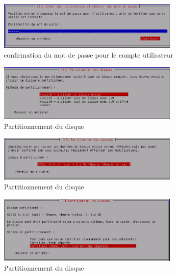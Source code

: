 \documentclass[11pt,a4paper,titlepage, oneside]{article}
\begin{document}
		\begin{figure}[htp]
                        \centering
                        \includegraphics[width=0.8\textwidth,natwidth=610,natheight=642]{images/debian11.png}
                        \caption{confirmation du mot de passe pour le compte utilisateur}
		\end{figure}

		\begin{figure}[htp]
                        \centering
                        \includegraphics[width=0.8\textwidth,natwidth=610,natheight=642]{images/debian12.png}
                        \caption{Partitionnement du disque}
		\end{figure}

		\begin{figure}[htp]
                        \centering
                        \includegraphics[width=0.8\textwidth,natwidth=610,natheight=642]{images/debian13.png}
                        \caption{Partitionnement du disque}
		\end{figure}

		\begin{figure}[htp]
                        \centering
                        \includegraphics[width=0.8\textwidth,natwidth=610,natheight=642]{images/debian14.png}
                        \caption{Partitionnement du disque}
		\end{figure}
\end{document}
